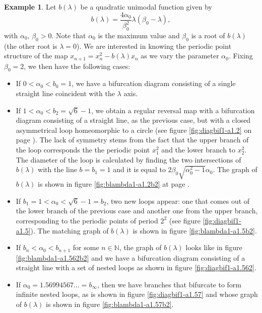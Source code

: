 \documentclass[10pt,twoside,titlepage]{book}
\numberwithin{equation}{chapter}
\numberwithin{figure}{chapter}
\numberwithin{table}{chapter}
\theoremstyle{plain}%
\theoremstyle{definition}
\newtheorem{example}{Example}[chapter]
\theoremstyle{remark}
\begin{document}
\begin{example}
	\label{eg:quadratic1} Let $b(\lambda)$ be a quadratic unimodal function given by
	\[b(\lambda)=\frac{4\alpha_{0}}{\beta_{0}^{2}}\lambda(\beta_{0}-\lambda),\]
	with $\alpha_{0},\,\beta_{0}>0$. Note that $\alpha_{0}$ is the maximum value and $\beta_{0}$ is a root of $b(\lambda)$ (the other root is $\lambda=0$). We are interested in knowing the periodic point structure of the map $x_{n+1}=x_{n}^{2}-b(\lambda)x_{n}$ as we vary the parameter $\alpha_{0}$. Fixing $\beta_{0}=2$, we then have the following cases:
	
	\begin{itemize}
		\item If $0<\alpha_{0}<b_{0}=1$, we have a bifurcation diagram consisting of a single straight line coincident with the $\lambda$ axis.
		\item If $1<\alpha_{0}<b_{2}=\sqrt{6}-1$, we obtain a regular reversal map with a bifurcation diagram consisting of a straight line, as the previous case, but with a closed asymmetrical loop homeomorphic to a circle (see figure \ref{fig:diagbif1-a1.2} on page \pageref{fig:diagbif1-a1.2}). The lack of symmetry stems from the fact that the upper branch of the loop corresponds the the periodic point $x_{1}^{2}$ and the lower branch to $x_{2}^{2}$. The diameter of the loop is calculated by finding the two intersections of $b(\lambda)$ with the line $b=b_{1}=1$ and it is equal to $2\beta_{0}\sqrt{\alpha_{0}^{2}-1}\alpha_{0}$. The graph of $b(\lambda)$ is shown in figure \ref{fig:blambda1-a1.2b2} at page \pageref{fig:blambda1-a1.2b2}.
		\item If $b_{1}=1<\alpha_{0}<\sqrt{6}-1=b_{2}$, two new loops appear: one that comes out of the lower branch of the previous case and another one from the upper branch, corresponding to the periodic points of period $2^{2}$ (see figure \ref{fig:diagbif1-a1.5}). The matching graph of $b(\lambda)$ is shown in figure \ref{fig:blambda1-a1.5b2}.
		\item If $b_{n}<\alpha_{0}<b_{n+1}$ for some $n\in\mathbb{N}$, the graph of $b(\lambda)$ looks like in figure \ref{fig:blambda1-a1.562b2} and we have a bifurcation diagram consisting of a straight line with a set of nested loops as shown in figure \ref{fig:diagbif1-a1.562}.
		\item If $\alpha_{0}=1.56994567...=b_{\infty}$, then we have branches that bifurcate to form infinite nested loops, as is shown in figure \ref{fig:diagbif1-a1.57} and whose graph of $b(\lambda)$ is shown in figure \ref{fig:blambda1-a1.57b2}.
	\end{itemize}
	

\end{example}
\end{document}
